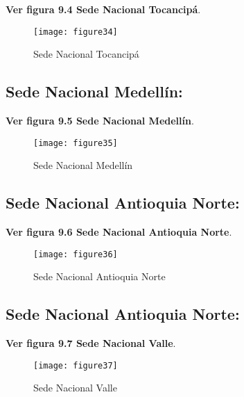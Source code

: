 \textbf{Ver figura 9.4 Sede Nacional Tocancipá}.
\begin{figure}[htbp]
  \centering
    {\texttt{[image: figure34]}}%
  \caption{Sede Nacional Tocancipá}
  \label{fig:fig2subfig}
\end{figure}

\subsection{Sede Nacional Medellín:} %
\label{sec:Sede Nacional Medellín:}

\textbf{Ver figura 9.5 Sede Nacional Medellín}.
\begin{figure}[htbp]
  \centering
    {\texttt{[image: figure35]}}%
  \caption{Sede Nacional Medellín}
  \label{fig:fig2subfig}
\end{figure}

\subsection{Sede Nacional Antioquia Norte:} %
\label{sec:Sede Nacional Antioquia Norte:}

\textbf{Ver figura 9.6 Sede Nacional Antioquia Norte}.
\begin{figure}[htbp]
  \centering
    {\texttt{[image: figure36]}}%
  \caption{Sede Nacional Antioquia Norte}
  \label{fig:fig2subfig}
\end{figure}

\subsection{Sede Nacional Antioquia Norte:} %
\label{sec:Sede Nacional Antioquia Norte:}

\textbf{Ver figura 9.7 Sede Nacional Valle}.
\begin{figure}[htbp]
  \centering
    {\texttt{[image: figure37]}}%
  \caption{Sede Nacional Valle}
  \label{fig:fig2subfig}
\end{figure}

